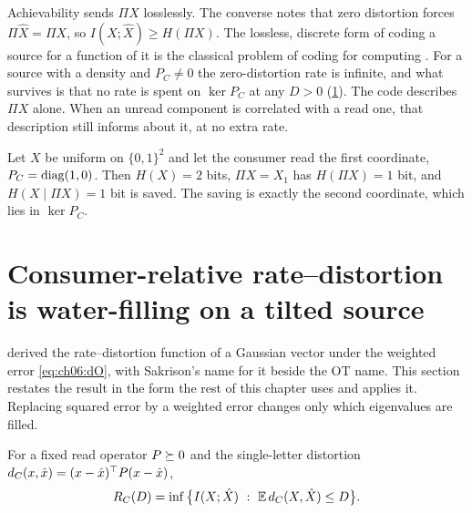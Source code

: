 Achievability sends $\Pi X$ losslessly. The converse notes that zero distortion forces $\Pi\hat X=\Pi X$, so $I(X;\hat X)\ge H(\Pi X)$. The lossless, discrete form of coding a source for a function of it is the classical problem of coding for computing \cite{orlitskyroche2001}. For a source with a density and $P_C\ne0$ the zero-distortion rate is infinite, and what survives is that no rate is spent on $\ker P_C$ at any $D>0$ (\cref{sec:ch06:rd}). The code describes $\Pi X$ alone. When an unread component is correlated with a read one, that description still informs about it, at no extra rate.

\begin{example}\label{ex:ch06:quotient}
Let $X$ be uniform on $\{0,1\}^2$ and let the consumer read the first coordinate, $P_C=\operatorname{diag}(1,0)$. Then $H(X)=2$ bits, $\Pi X=X_1$ has $H(\Pi X)=1$ bit, and $H(X\mid\Pi X)=1$ bit is saved. The saving is exactly the second coordinate, which lies in $\ker P_C$.
\end{example}



\section{Consumer-relative rate--distortion is water-filling on a tilted source}\label{sec:ch06:rd}

 derived the rate--distortion function of a Gaussian vector under the weighted error \cref{eq:ch06:dO}, with Sakrison's name for it beside the OT name. This section restates the result in the form the rest of this chapter uses and applies it. Replacing squared error by a weighted error changes only which eigenvalues are filled.

\begin{definition}\label{def:ch06:RC}
For a fixed read operator $P\succeq 0$ and the single-letter distortion $d_C(x,\hat x)=(x-\hat x)^{\top} P(x-\hat x)$,
\begin{equation}\label{eq:ch06:RC}
R_C(D)=\inf\big\{I(X;\hat X)\ :\ \mathbb{E}\, d_C(X,\hat X)\le D\big\}.
\end{equation}
\end{definition}

